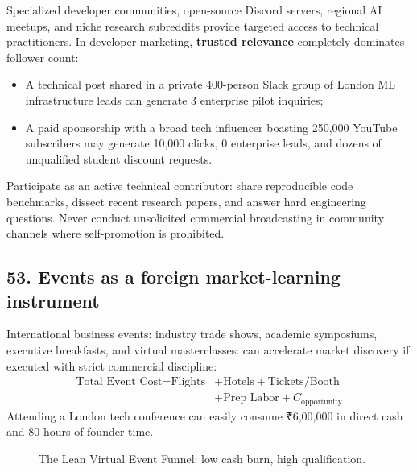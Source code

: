 Specialized developer communities, open-source Discord servers, regional AI meetups, and niche research subreddits provide targeted access to technical practitioners. In developer marketing, \textbf{trusted relevance} completely dominates follower count:
\begin{itemize}
    \item A technical post shared in a private 400-person Slack group of London ML infrastructure leads can generate 3 enterprise pilot inquiries;
    \item A paid sponsorship with a broad tech influencer boasting 250,000 YouTube subscribers may generate 10,000 clicks, 0 enterprise leads, and dozens of unqualified student discount requests.
\end{itemize}
Participate as an active technical contributor: share reproducible code benchmarks, dissect recent research papers, and answer hard engineering questions. Never conduct unsolicited commercial broadcasting in community channels where self-promotion is prohibited.

\subsection{53. Events as a foreign market-learning instrument}

International business events: industry trade shows, academic symposiums, executive breakfasts, and virtual masterclasses: can accelerate market discovery if executed with strict commercial discipline:
\begin{equation}
\begin{aligned}
\text{Total Event Cost} = \text{Flights} &+ \text{Hotels} + \text{Tickets/Booth} \\
&+ \text{Prep Labor} + C_{\text{opportunity}}
\end{aligned}
\end{equation}
Attending a London tech conference can easily consume ₹6,00,000 in direct cash and 80 hours of founder time.

\begin{figure}[htbp]
\centering
{}
\caption{The Lean Virtual Event Funnel: low cash burn, high qualification.}
\label{fig:lean_event_funnel}
\end{figure}

